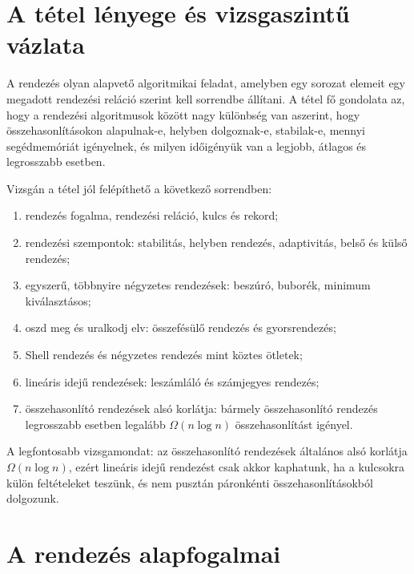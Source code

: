 \section{A tétel lényege és vizsgaszintű vázlata}

\begin{summarybox}
A rendezés olyan alapvető algoritmikai feladat, amelyben egy sorozat elemeit egy megadott rendezési reláció szerint kell sorrendbe állítani. A tétel fő gondolata az, hogy a rendezési algoritmusok között nagy különbség van aszerint, hogy összehasonlításokon alapulnak-e, helyben dolgoznak-e, stabilak-e, mennyi segédmemóriát igényelnek, és milyen időigényük van a legjobb, átlagos és legrosszabb esetben.
\end{summarybox}

Vizsgán a tétel jól felépíthető a következő sorrendben:

\begin{enumerate}
  \item rendezés fogalma, rendezési reláció, kulcs és rekord;
  \item rendezési szempontok: stabilitás, helyben rendezés, adaptivitás, belső és külső rendezés;
  \item egyszerű, többnyire négyzetes rendezések: beszúró, buborék, minimum kiválasztásos;
  \item oszd meg és uralkodj elv: összefésülő rendezés és gyorsrendezés;
  \item Shell rendezés és négyzetes rendezés mint köztes ötletek;
  \item lineáris idejű rendezések: leszámláló és számjegyes rendezés;
  \item összehasonlító rendezések alsó korlátja: bármely összehasonlító rendezés legrosszabb esetben legalább $\Omega(n\log n)$ összehasonlítást igényel.
\end{enumerate}

A legfontosabb vizsgamondat: az összehasonlító rendezések általános alsó korlátja $\Omega(n\log n)$, ezért lineáris idejű rendezést csak akkor kaphatunk, ha a kulcsokra külön feltételeket teszünk, és nem pusztán páronkénti összehasonlításokból dolgozunk.

\begin{center}

\end{center}

\section{A rendezés alapfogalmai}

